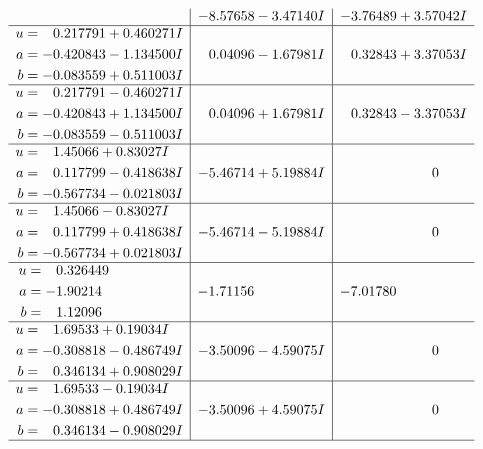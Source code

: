 \documentclass[1p]{elsarticle_modified}
\theoremstyle{definition}
\begin{document}
$$\begin{array}{c|c|c}
 & -8.57658 - 3.47140 I & -3.76489 + 3.57042 I \\ \hline\begin{aligned}
u &= \phantom{-}0.217791 + 0.460271 I \\
a &= -0.420843 - 1.134500 I \\
b &= -0.083559 + 0.511003 I\end{aligned}
 & \phantom{-}0.04096 - 1.67981 I & \phantom{-}0.32843 + 3.37053 I \\ \hline\begin{aligned}
u &= \phantom{-}0.217791 - 0.460271 I \\
a &= -0.420843 + 1.134500 I \\
b &= -0.083559 - 0.511003 I\end{aligned}
 & \phantom{-}0.04096 + 1.67981 I & \phantom{-}0.32843 - 3.37053 I \\ \hline\begin{aligned}
u &= \phantom{-}1.45066 + 0.83027 I \\
a &= \phantom{-}0.117799 - 0.418638 I \\
b &= -0.567734 - 0.021803 I\end{aligned}
 & -5.46714 + 5.19884 I & \phantom{-0.000000 } 0 \\ \hline\begin{aligned}
u &= \phantom{-}1.45066 - 0.83027 I \\
a &= \phantom{-}0.117799 + 0.418638 I \\
b &= -0.567734 + 0.021803 I\end{aligned}
 & -5.46714 - 5.19884 I & \phantom{-0.000000 } 0 \\ \hline\begin{aligned}
u &= \phantom{-}0.326449\phantom{ +0.000000I} \\
a &= -1.90214\phantom{ +0.000000I} \\
b &= \phantom{-}1.12096\phantom{ +0.000000I}\end{aligned}
 & -1.71156\phantom{ +0.000000I} & -7.01780\phantom{ +0.000000I} \\ \hline\begin{aligned}
u &= \phantom{-}1.69533 + 0.19034 I \\
a &= -0.308818 - 0.486749 I \\
b &= \phantom{-}0.346134 + 0.908029 I\end{aligned}
 & -3.50096 - 4.59075 I & \phantom{-0.000000 } 0 \\ \hline\begin{aligned}
u &= \phantom{-}1.69533 - 0.19034 I \\
a &= -0.308818 + 0.486749 I \\
b &= \phantom{-}0.346134 - 0.908029 I\end{aligned}
 & -3.50096 + 4.59075 I & \phantom{-0.000000 } 0\\
 \hline 
 \end{array}$$\newpage\newpage\renewcommand{\arraystretch}{1}
\end{document}
